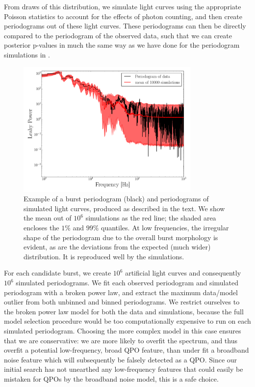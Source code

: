 \documentclass[numberedappendix]{emulateapj}
\begin{document}
From draws of this distribution, we simulate light curves using the appropriate Poisson statistics to account for the effects of photon counting, and then create periodograms out of these light curves. These periodograms can then be directly compared to the periodogram of the observed data, such that we can create posterior p-values in much the same way as we have done for the periodogram simulations in \citep{huppenkothen2013}. 

\begin{figure}[htbp]
\begin{center}
\includegraphics[width=9cm]{f7.pdf}
\caption{Example of a burst periodogram (black) and periodograms of simulated light curves, produced as described in the text. We show the mean out of $10^6$ simulations as the red line; the shaded area encloses the $1\%$ and $99\%$ quantiles. At low frequencies, the irregular shape
of the periodogram due to the overall burst morphology is evident, as are the deviations from the expected (much wider) distribution.  It is reproduced well by the simulations.}
\label{fig:burst_lcmodel_ps}
\end{center}
\end{figure}
For each candidate burst, we create $10^6$ artificial light curves and consequently $10^6$ simulated periodograms. We fit each observed periodogram and simulated periodogram with a broken power law, and extract the maximum data/model outlier from both unbinned and binned periodograms. We restrict ourselves to the broken power law model for both the data and simulations, because the full model selection procedure would be too computationally expensive to run on each simulated periodogram. Choosing the more complex model in this case ensures that we are conservative: we are more likely to overfit the spectrum, and thus overfit a potential low-frequency, broad QPO feature, than under fit a broadband noise feature which will subsequently be falsely detected as a QPO. Since our initial search has not unearthed any low-frequency features that could easily be mistaken for QPOs by the broadband noise model, this is a safe choice.
\end{document}
